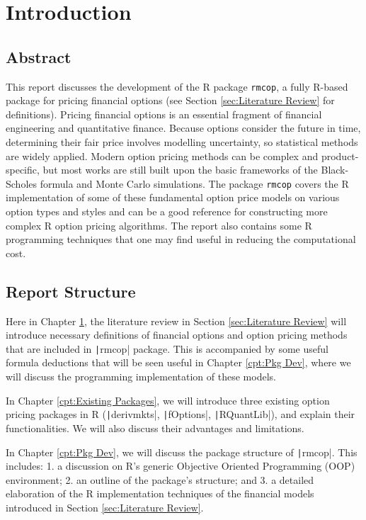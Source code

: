 \chapter{Introduction} \label{cpt:Introduction}

\section{Abstract}

This report discusses the development of the R package \texttt{rmcop}, a fully R-based package for pricing financial options (see Section \ref{sec:Literature Review} for definitions). Pricing financial options is an essential fragment of financial engineering and quantitative finance. Because options consider the future in time, determining their fair price involves modelling uncertainty, so statistical methods are widely applied. Modern option pricing methods can be complex and product-specific, but most works are still built upon the basic frameworks of the Black-Scholes formula and Monte Carlo simulations. The package \texttt{rmcop} covers the R implementation of some of these fundamental option price models on various option types and styles and can be a good reference for constructing more complex R option pricing algorithms. The report also contains some R programming techniques that one may find useful in reducing the computational cost.

\section{Report Structure}

Here in Chapter \ref{cpt:Introduction}, the literature review in Section \ref{sec:Literature Review} will introduce necessary definitions of financial options and option pricing methods that are included in \texttt|rmcop| package. This is accompanied by some useful formula deductions that will be seen useful in Chapter \ref{cpt:Pkg Dev}, where we will discuss the programming implementation of these models.

In Chapter \ref{cpt:Existing Packages}, we will introduce three existing option pricing packages in R (\texttt|derivmkts|, \texttt|fOptions|, \texttt|RQuantLib|), and explain their functionalities. We will also discuss their advantages and limitations.

In Chapter \ref{cpt:Pkg Dev}, we will discuss the package structure of \texttt|rmcop|. This includes: 1. a discussion on R's generic Objective Oriented Programming (OOP) environment; 2. an outline of the package's structure; and 3. a detailed elaboration of the R implementation techniques of the financial models introduced in Section \ref{sec:Literature Review}.

